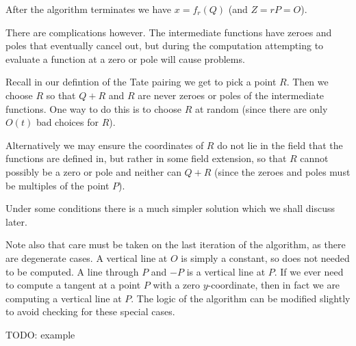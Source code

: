After the algorithm terminates we have $x = f_r(Q)$ (and $Z = rP = O$).

There are complications however. The intermediate functions have zeroes
and poles that eventually cancel out, but during the computation
attempting to evaluate a function at a zero or pole will cause problems.

Recall in our defintion of the Tate pairing we get to pick a point $R$.
Then we choose $R$ so that $Q+R$ and $R$ are never zeroes or poles
of the intermediate functions. One way to do this is to choose
$R$ at random (since there are only $O(t)$ bad choices for $R$).

Alternatively we may ensure the coordinates of $R$ do not lie in the
field that the functions are defined in, but rather in some field
extension, so that
$R$ cannot possibly be a zero or pole and neither can $Q + R$ (since the
zeroes and poles must be multiples of the point $P$).

Under some conditions there is a much simpler solution which we shall
discuss later.

Note also that care must be taken on the last iteration of the algorithm,
as there are degenerate cases. A vertical line at $O$ is simply a constant,
so does not needed to be computed. A line through $P$ and $-P$ is a vertical
line at $P$. If we ever need to compute a tangent at a point $P$ with a zero
$y$-coordinate, then in fact we are computing a vertical line at $P$.
The logic of the algorithm can be modified slightly to avoid checking
for these special cases.

TODO: example
